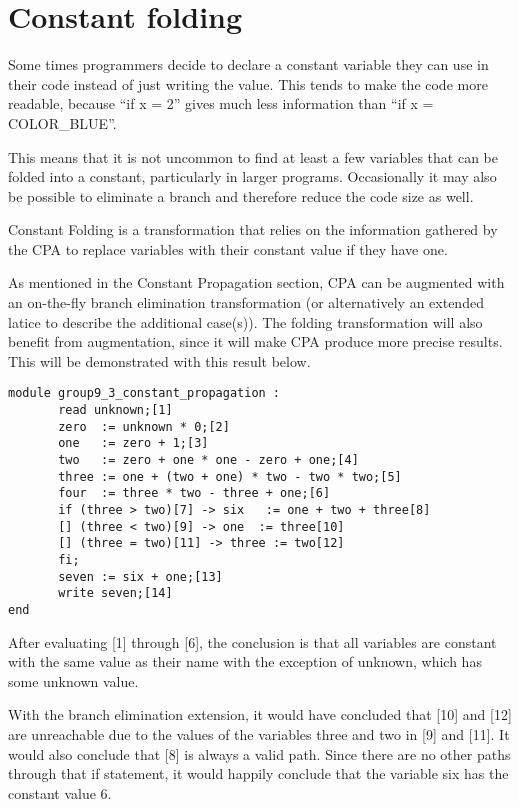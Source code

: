 \section{Constant folding}
Some times programmers decide to declare a constant variable they can use
in their code instead of just writing the value. This tends to make the
code more readable, because ``if x = 2'' gives much less information than
``if x = COLOR\_BLUE''.

  This means that it is not uncommon to find at least a few variables
that can be folded into a constant, particularly in larger programs.
Occasionally it may also be possible to eliminate a branch and therefore
reduce the code size as well.  

\docpar
Constant Folding is a transformation that relies on the information
gathered by the CPA to replace variables with their constant value
if they have one.

  As mentioned in the Constant Propagation section,
CPA can be augmented with an on-the-fly branch elimination transformation
(or alternatively an extended latice to describe the additional case(s)).
The folding transformation will also benefit from augmentation, since it
will make CPA produce more precise results. This will be demonstrated with
this result below.

\begin{lstlisting}
module group9_3_constant_propagation :
       read unknown;[1]
       zero  := unknown * 0;[2]
       one   := zero + 1;[3]
       two   := zero + one * one - zero + one;[4]
       three := one + (two + one) * two - two * two;[5]
       four  := three * two - three + one;[6]
       if (three > two)[7] -> six   := one + two + three[8]
       [] (three < two)[9] -> one  := three[10]
       [] (three = two)[11] -> three := two[12]
       fi;
       seven := six + one;[13]
       write seven;[14]
end
\end{lstlisting}

\docpar
After evaluating [1] through [6], the conclusion is that all variables are constant
with the same value as their name with the exception of unknown, which has some
unknown value. 

  With the branch elimination extension, it would have concluded that [10] and
[12] are unreachable due to the values of the variables three and two in [9] and
[11]. It would also conclude that [8] is always a valid path. Since there are
no other paths through that if statement, it would happily conclude that the
variable six has the constant value 6.

